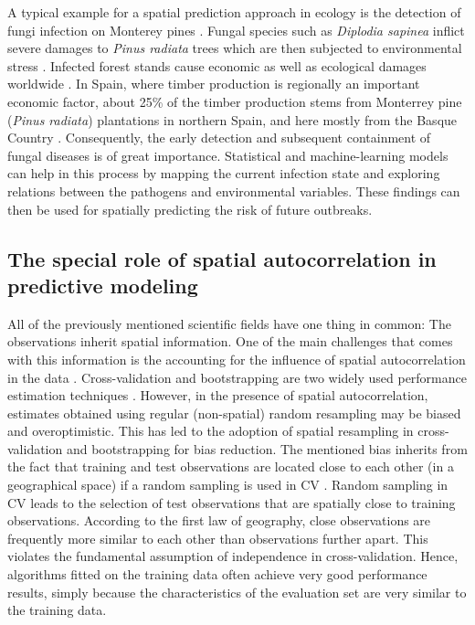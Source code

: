 \documentclass[review]{elsarticle}
\begin{document}
A typical example for a spatial prediction approach in ecology is the detection of fungi infection on Monterey pines \citep{Iturritxa2014}.
Fungal species such as \textit{Diplodia sapinea} inflict severe damages to \textit{Pinus radiata} trees which are then subjected to environmental stress \citep{Wingfield2008}.
Infected forest stands cause economic as well as ecological damages worldwide \citep{Ganley2009}.
In Spain, where timber production is regionally an important economic factor, about 25\% of the timber production stems from Monterrey pine (\textit{Pinus radiata}) plantations in northern Spain, and here mostly from the Basque Country \citep{Iturritxa2014}.
Consequently, the early detection and subsequent containment of fungal diseases is of great importance.
Statistical and machine-learning models can help in this process by mapping the current infection state and exploring relations between the pathogens and environmental variables.
These findings can then be used for spatially predicting the risk of future outbreaks.

\subsection{The special role of spatial autocorrelation in predictive modeling}
\label{subsec:spcv_pred_mod}
All of the previously mentioned scientific fields have one thing in common: The observations inherit spatial information.
One of the main challenges that comes with this information is the accounting for the influence of spatial autocorrelation in the data \citep{Legendre1993}.
Cross-validation and bootstrapping are two widely used performance estimation techniques \citep{Efron1983, Gordon1984, Kohavi1995}.
However, in the presence of spatial autocorrelation, estimates obtained using regular (non-spatial) random resampling may be biased and overoptimistic.
This has led to the adoption of spatial resampling in cross-validation and bootstrapping for bias reduction.
The mentioned bias inherits from the fact that training and test observations are located close to each other (in a geographical space) if a random sampling is used in \ac{CV} \citep{Legendre1993}.
Random sampling in CV leads to the selection of test observations that are spatially close to training observations.
According to the first law of geography, close observations are frequently more similar to each other than observations further apart.
This violates the fundamental assumption of independence in cross-validation.
Hence, algorithms fitted on the training data often achieve very good performance results, simply because the characteristics of the evaluation set are very similar to the training data.
\end{document}

